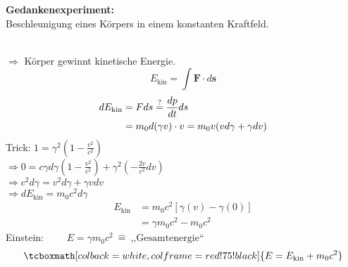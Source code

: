 \documentclass[titlepage,11pt,a4paper,ngerman]{report}
\newcommand{\tx}[1]{\textrm{#1}}
\renewcommand{\vec}[1]{\boldsymbol{#1}}
\newcommand{\rmbox}[1]{\tcboxmath[colback=white,colframe=red!75!black]{#1}}
\begin{document}
\begin{minipage}{.5\linewidth}
	\textbf{Gedankenexperiment:}\\[5pt]
	Beschleunigung eines Körpers in einem konstanten Kraftfeld.
\end{minipage}%
\begin{minipage}{.5\linewidth}
	\hspace{50pt}
\end{minipage}%
\\
$ \Rightarrow $ Körper gewinnt kinetische Energie.
\begin{equation*}
E_{\tx{kin}} = \int \vec{F} \cdot d\vec{s}
\end{equation*}
\begin{align*}
dE_{\tx{kin}} &= F ds \buildrel ? \over = \frac{dp}{dt} ds\\
&= m_0 d(\gamma v) \cdot v = m_0 v (v d \gamma + \gamma dv)
\end{align*}
Trick:
$ 1 = \gamma^2 \left( 1 - \frac{v^2}{c^2} \right) $\\
$ \Rightarrow 0 = c \gamma d \gamma \left(1 - \frac{v^2}{c^2}\right) + \gamma ^2 \left(- \frac{2v}{c^2} dv \right) $\\
$ \Rightarrow c^2 d \gamma = v^2 d\gamma + \gamma v dv $\\
$ \Rightarrow d E_{\tx{kin}} = m_0 c^2 d \gamma $
\begin{align*}
E_{\tx{kin}} &= m_0 c^2 \left[\gamma(v) - \gamma(0)\right]\\
&= \gamma m_0 c^2 - m_0 c^2
\end{align*}
Einstein: $ \qquad E = \gamma m_0 c^2 \ \widehat{ = }\ \tx{,,Gesamtenergie``} $
\begin{equation*}
\rmbox{E = E_{\tx{kin}} + m_0 c^2}
\end{equation*}
\end{document}
